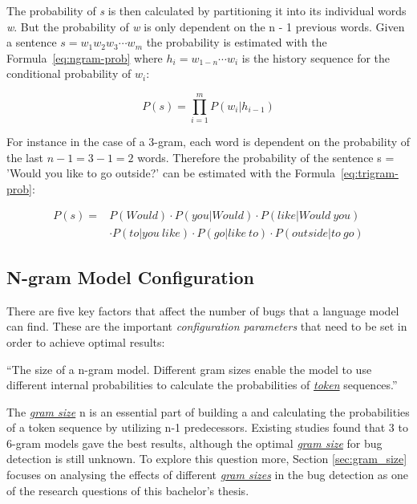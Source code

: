 The probability of \textit{s} is then calculated by partitioning it into its individual words \textit{w}. But the probability of \textit{w} is only dependent on the n - 1 previous words. Given a sentence \( s = w_1w_2w_3\cdots w_m \) the probability is estimated with the Formula~\ref{eq:ngram-prob} where \(h_i = w_{1-n}\cdots w_i \) is the history sequence for the conditional probability of \(w_i\):

\begin{equation} \label{eq:ngram-prob}
P(s) ={} \displaystyle\prod_{i=1}^{m} P(w_i|h_{i-1})
\end{equation}

For instance in the case of a 3-gram, each word is dependent on the probability of the last \(n - 1 = 3 - 1 = 2 \) words. Therefore the probability of the sentence s = 'Would you like to go outside?' can be estimated with the Formula~\ref{eq:trigram-prob}:

\begin{equation}\label{eq:trigram-prob}
\begin{aligned}
P(s) ={} & P(Would)\cdot P(you|Would)\cdot P(like|Would\ you) \\ 
		 & \cdot P(to|you\ like)\cdot P(go|like\ to)\cdot P(outside|to\ go)
\end{aligned}
\end{equation} 
  
\subsection{N-gram Model Configuration}\label{subsec:configuration}
There are five key factors that affect the number of bugs that a language model can find. These are the important \textit{configuration parameters} that need to be set in order to achieve optimal results:  

\begin{definition}\label{def:gram_size}
    ``The size of a n-gram model. Different gram sizes enable the model to use different internal probabilities to calculate the probabilities of \hyperref[def:token]{\textit{token}} sequences.''~\cite{bugram}
\end{definition}

The \hyperref[def:gram_size]{\textit{gram size}} n is an essential part of building a \ngram{} and calculating the probabilities of a token sequence by utilizing n-1 predecessors. Existing studies found that 3 to 6-gram models gave the best results, although the optimal \hyperref[def:gram_size]{\textit{gram size}} for bug detection is still unknown. To explore this question more, Section \ref{sec:gram_size} focuses on analysing the effects of different \hyperref[def:gram_size]{\textit{gram sizes}} in the \scratch{} bug detection as one of the research questions of this bachelor's thesis.


